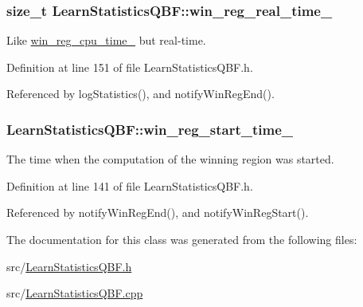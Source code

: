 \hypertarget{classLearnStatisticsQBF_a58013212d789d3c025b521cd150dc12d}{
\subsubsection[{win\-\_\-reg\-\_\-real\-\_\-time\-\_\-}]{\setlength{\rightskip}{0pt plus 5cm}size\-\_\-t Learn\-Statistics\-Q\-B\-F\-::win\-\_\-reg\-\_\-real\-\_\-time\-\_\-\hspace{0.3cm}{\ttfamily [protected]}}}\label{classLearnStatisticsQBF_a58013212d789d3c025b521cd150dc12d}


Like \hyperlink{classLearnStatisticsQBF_a679a221c1cbf3330572f93d850976289}{win\-\_\-reg\-\_\-cpu\-\_\-time\-\_\-} but real-\/time. 



Definition at line 151 of file Learn\-Statistics\-Q\-B\-F.\-h.



Referenced by log\-Statistics(), and notify\-Win\-Reg\-End().

\hypertarget{classLearnStatisticsQBF_a2c1d2ca27ab1a5edf496ffd603ba0878}{
\subsubsection[{win\-\_\-reg\-\_\-start\-\_\-time\-\_\-}]{ Learn\-Statistics\-Q\-B\-F\-::win\-\_\-reg\-\_\-start\-\_\-time\-\_\-\hspace{0.3cm}{\ttfamily [protected]}}}\label{classLearnStatisticsQBF_a2c1d2ca27ab1a5edf496ffd603ba0878}


The time when the computation of the winning region was started. 



Definition at line 141 of file Learn\-Statistics\-Q\-B\-F.\-h.



Referenced by notify\-Win\-Reg\-End(), and notify\-Win\-Reg\-Start().



The documentation for this class was generated from the following files\-:\begin{DoxyCompactItemize}
\item 
src/\hyperlink{LearnStatisticsQBF_8h}{Learn\-Statistics\-Q\-B\-F.\-h}\item 
src/\hyperlink{LearnStatisticsQBF_8cpp}{Learn\-Statistics\-Q\-B\-F.\-cpp}\end{DoxyCompactItemize}
